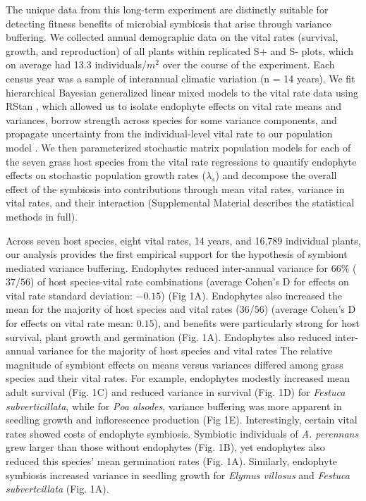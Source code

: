 \documentclass[12pt]{article}
\begin{document}
The unique data from this long-term experiment are distinctly suitable for detecting fitness benefits of microbial symbiosis that arise through variance buffering. 
We collected annual demographic data on the vital rates (survival, growth, and reproduction) of all plants within replicated S+ and S- plots, which on average had 13.3 individuals/$m^2$ over the course of the experiment. 
Each census year was a sample of interannual climatic variation (n = 14 years).
We fit hierarchical Bayesian generalized linear mixed models to the vital rate data using RStan \cite{rstan2022}, which allowed us to isolate endophyte effects on vital rate means and variances, borrow strength across species for some variance components, and propagate uncertainty from the individual-level vital rate to our population model \cite{elderd2016quantifying}. 
We then parameterized stochastic matrix population models for each of the seven grass host species from the vital rate regressions to quantify endophyte effects on stochastic population growth rates ($\lambda_s$) and decompose the overall effect of the symbiosis into contributions through mean vital rates, variance in vital rates, and their interaction (Supplemental Material describes the statistical methods in full).

Across seven host species, eight vital rates, 14 years, and 16,789 individual plants, our analysis provides the first empirical support for the hypothesis of symbiont mediated variance buffering. Endophytes reduced inter-annual variance for 66\% ($37$/$56$) of host species-vital rate combinations (average Cohen's D for effects on vital rate standard deviation: $-0.15$) (Fig 1A). 
Endophytes also increased the mean for the majority of host species and vital rates ($36$/$56$) (average Cohen's D for effects on vital rate mean: $0.15$), and benefits were particularly strong for host survival, plant growth and germination (Fig. 1A).
Endophytes also reduced inter-annual variance for the majority of host species and vital rates 
The relative magnitude of symbiont effects on means versus variances differed among grass species and their vital rates.
For example, endophytes modestly increased mean adult survival (Fig. 1C) and reduced variance in survival (Fig. 1D) for \emph{Festuca subverticillata}, while for \emph{Poa alsodes}, variance buffering was more apparent in seedling growth and inflorescence production (Fig 1E). 
Interestingly, certain vital rates showed costs of endophyte symbiosis. 
Symbiotic individuals of \emph{A. perennans} grew larger than those without endophytes (Fig. 1B), yet endophytes also reduced this species' mean germination rates (Fig. 1A). 
Similarly, endophyte symbiosis increased variance in seedling growth for \emph{Elymus villosus} and \emph{Festuca subvertcillata} (Fig. 1A).
 
\end{document}
